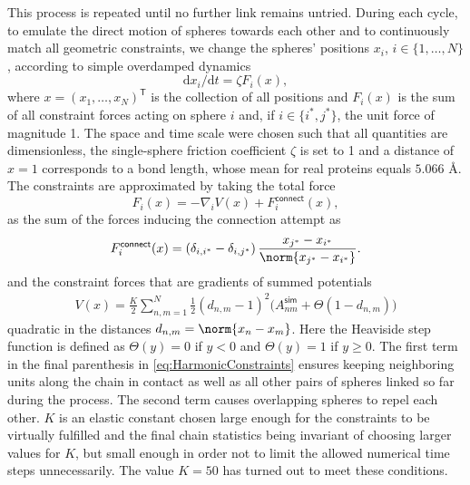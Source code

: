 \documentclass[9pt]{elife}
\begin{document}
This process is repeated until no further link remains untried. During each cycle, to emulate the direct motion of spheres towards each other and to continuously match all geometric constraints, we change the spheres' positions $x_i$, $i\in\{1,\dots,N\}$, according to simple overdamped dynamics 
\[
\text{d}x_i/\text{d}t=\zeta F_i(x),
\]
where $x=(x_1,\ldots,x_N)^\textsf{T}$ is the collection of all positions and $F_i(x)$ is the sum of all constraint forces acting on sphere $i$ and, if $i\in\{i^*,j^*\}$, the unit force of magnitude 1. The space and time scale were chosen such that all quantities are dimensionless, the single-sphere friction coefficient $\zeta$ is set to 1 and a distance of $x=1$ corresponds to a bond length, whose mean for real proteins equals $5.066$ \AA.\\
The constraints are approximated by taking the total force 
\begin{equation*}
    F_i(x) = - \nabla_{i}V(x) + F^{\mathsf{connect}}_i(x),
\end{equation*} 
as the sum of the forces inducing the connection attempt as
\begin{equation}
    F^{\mathsf{connect}}_i(x) = \left(\delta_{i,i^*}-\delta_{i,j^*}\right)\frac{x_{j^*}-x_{i^*}}{\norm{x_{j^*}-x_{i^*}}}.
\end{equation}
and the constraint forces that are gradients of summed potentials 
\begin{equation}
\begin{aligned}
V(x)=\frac{K}{2}\sum_{n,m=1}^{N}\frac{1}{2}(d_{n,m}-1)^2\big(A_{nm}^{\textsf{sim}}+\Theta(1-d_{n,m})\big)
\label{eq:HarmonicConstraints}
\end{aligned}
\end{equation}
quadratic in the distances $d_{n,m}=\norm{x_n-x_m}$. Here the Heaviside step function is defined as $\Theta(y)=0$ if \mbox{$y <0$} and $\Theta(y)=1$ if $y\geq0$. The first term in the final parenthesis in \eqref{eq:HarmonicConstraints} ensures keeping neighboring units along the chain in contact as well as all other pairs of spheres linked so far during the process. The second term causes overlapping spheres to repel each other.
$K$ is an elastic constant chosen large enough for the constraints to be virtually fulfilled and the final chain statistics being invariant of choosing larger values for $K$, but small enough in order not to limit the allowed numerical time steps unnecessarily. The value $K=50$ has turned out to meet these conditions.
\end{document}
